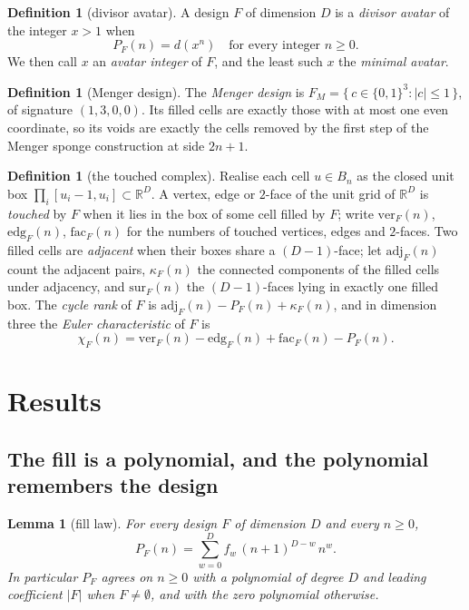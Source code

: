 \documentclass[11pt]{amsart}
\newtheorem{lemma}[theorem]{Lemma}
\theoremstyle{definition}
\newtheorem{definition}[theorem]{Definition}
\theoremstyle{remark}
\begin{document}
\begin{definition}[divisor avatar]
\label{def:avatar}
A design $F$ of dimension $D$ is a \emph{divisor avatar} of the integer $x > 1$ when
\[
  P_{F}(n) = d(x^{n}) \quad \text{for every integer } n \ge 0 .
\]
We then call $x$ an \emph{avatar integer} of $F$, and the least such $x$ the \emph{minimal avatar}.
\end{definition}

\begin{definition}[Menger design]
\label{def:menger}
The \emph{Menger design} is $F_{M} = \{\, c \in \{0,1\}^{3} : |c| \le 1 \,\}$, of signature $(1,3,0,0)$. Its filled cells are exactly those with at most one even coordinate, so its voids are exactly the cells removed by the first step of the Menger sponge construction at side $2n+1$.
\end{definition}

\begin{definition}[the touched complex]
\label{def:touched}
Realise each cell $u \in B_{n}$ as the closed unit box $\prod_{i}[u_{i}-1,u_{i}] \subset \mathbb{R}^{D}$. A vertex, edge or $2$-face of the unit grid of $\mathbb{R}^{D}$ is \emph{touched} by $F$ when it lies in the box of some cell filled by $F$; write $\mathrm{ver}_{F}(n)$, $\mathrm{edg}_{F}(n)$, $\mathrm{fac}_{F}(n)$ for the numbers of touched vertices, edges and $2$-faces. Two filled cells are \emph{adjacent} when their boxes share a $(D-1)$-face; let $\mathrm{adj}_{F}(n)$ count the adjacent pairs, $\kappa_{F}(n)$ the connected components of the filled cells under adjacency, and $\mathrm{sur}_{F}(n)$ the $(D-1)$-faces lying in exactly one filled box. The \emph{cycle rank} of $F$ is $\mathrm{adj}_{F}(n) - P_{F}(n) + \kappa_{F}(n)$, and in dimension three the \emph{Euler characteristic} of $F$ is
\[
  \chi_{F}(n) = \mathrm{ver}_{F}(n) - \mathrm{edg}_{F}(n) + \mathrm{fac}_{F}(n) - P_{F}(n).
\]
\end{definition}

\section{Results}
\label{sec:res}

\subsection*{The fill is a polynomial, and the polynomial remembers the design}

\begin{lemma}[fill law]
\label{lem:fill}
For every design $F$ of dimension $D$ and every $n \ge 0$,
\[
  P_{F}(n) = \sum_{w=0}^{D} f_{w}\,(n+1)^{D-w}\,n^{w} .
\]
In particular $P_{F}$ agrees on $n \ge 0$ with a polynomial of degree $D$ and leading coefficient $|F|$ when $F \neq \emptyset$, and with the zero polynomial otherwise.
\end{lemma}
\end{document}
